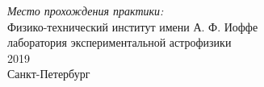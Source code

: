 \begin{titlepage}

{\large
\emph{Место прохождения практики:} \\
Физико-технический институт имени А. Ф. Иоффе\\ лаборатория экспериментальной астрофизики
}\\[3 cm]


{\large 2019 \\Санкт-Петербург}\\[0.55cm] %


 

\vfill %

\end{titlepage}
